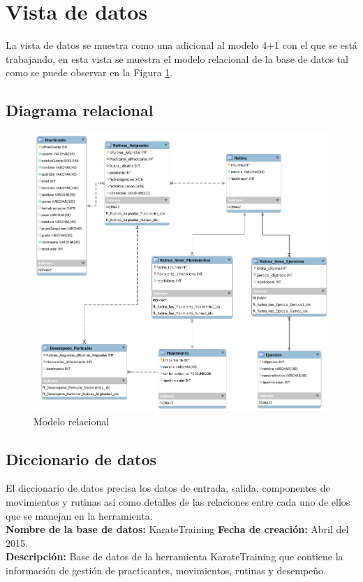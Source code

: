 \section{Vista de datos}
La vista de datos se muestra como una adicional al modelo 4+1 con el que se está trabajando, en esta vista se muestra el modelo relacional de la base de datos tal como se puede observar en la Figura \ref{fig:Entidad}.
\subsection{Diagrama relacional}

\begin{figure}[H]
	\begin{center}
		\includegraphics[scale=0.5]{./Figuras/Arquitectura/Modelo_relacional}
	\end{center}
	\caption{Modelo relacional}
	\label{fig:Entidad}
\end{figure}

\subsection{Diccionario de datos}
\label{sec:diccionario}

El diccionario de datos precisa los datos de entrada, salida, componentes de movimientos y rutinas así como detalles de las relaciones entre cada uno de ellos que se manejan en la herramienta.\\[0.5cm]
\textbf{Nombre de la base de datos: }KarateTraining \hspace{0.5cm}\textbf{Fecha de creación: }Abril del 2015.\\[0.25cm]
\textbf{Descripción: }Base de datos de la herramienta KarateTraining que contiene la información de gestión de practicantes, movimientos, rutinas y desempeño.

